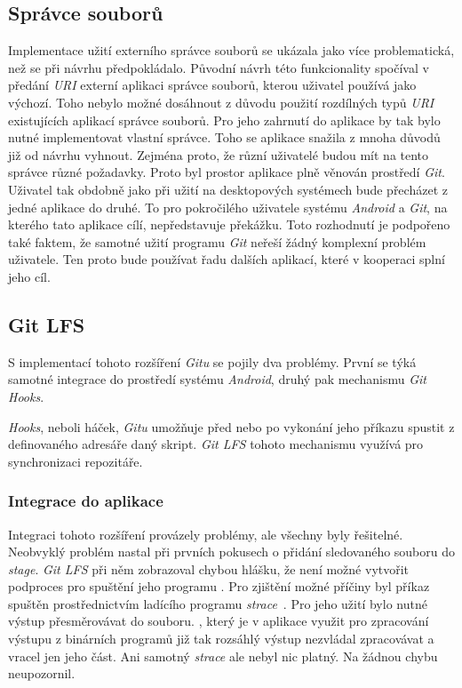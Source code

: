     \subsection{Správce souborů}
    Implementace užití externího správce souborů se ukázala jako více problematická, než se při návrhu předpokládalo. Původní návrh této funkcionality spočíval v předání \emph{URI} externí aplikaci správce souborů, kterou uživatel používá jako výchozí. Toho nebylo možné dosáhnout z důvodu použití rozdílných typů \emph{URI} existujících aplikací správce souborů. Pro jeho zahrnutí do aplikace by tak bylo nutné implementovat vlastní správce. Toho se aplikace snažila z mnoha důvodů již od návrhu vyhnout. Zejména proto, že různí uživatelé budou mít na tento správce různé požadavky. Proto byl prostor aplikace plně věnován prostředí \emph{Git}. Uživatel tak obdobně jako při užití na desktopových systémech bude přecházet z jedné aplikace do druhé. To pro pokročilého uživatele systému \emph{Android} a \emph{Git}, na kterého tato aplikace cílí, nepředstavuje překážku.
    Toto rozhodnutí je podpořeno také faktem, že samotné užití programu \emph{Git} neřeší žádný komplexní problém uživatele. Ten proto bude používat řadu dalších aplikací, které v kooperaci splní jeho cíl.

    \subsection{Git LFS}\label{sec:problemy_lfs}
    S implementací tohoto rozšíření \emph{Gitu} se pojily dva problémy. První se týká samotné integrace do prostředí systému \emph{Android}, druhý pak mechanismu \emph{Git Hooks}.

    \emph{Hooks}, neboli háček, \emph{Gitu} umožňuje před nebo po vykonání jeho příkazu spustit z definovaného adresáře daný skript. \emph{Git LFS} tohoto mechanismu využívá pro synchronizaci repozitáře.

    \subsubsection{Integrace do aplikace}
    Integraci tohoto rozšíření provázely problémy, ale všechny byly řešitelné. Neobvyklý problém nastal při prvních pokusech o přidání sledovaného souboru do \emph{stage}. \emph{Git LFS} při něm zobrazoval chybou hlášku, že není možné vytvořit podproces pro spuštění jeho programu . Pro zjištění možné příčiny byl příkaz  spuštěn prostřednictvím ladícího programu \emph{strace}~. Pro jeho užití bylo nutné výstup přesměrovávat do souboru. , který je v aplikace využit pro zpracování výstupu z binárních programů již tak rozsáhlý výstup nezvládal zpracovávat a vracel jen jeho část. Ani samotný \emph{strace} ale nebyl nic platný. Na žádnou chybu neupozornil.
    
